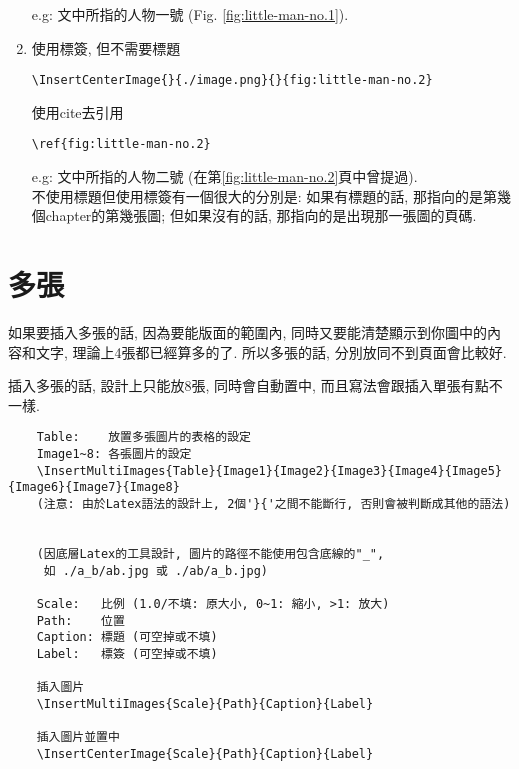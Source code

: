 \begin{enumerate}
{      e.g: 文中所指的人物一號 (Fig. \ref{fig:little-man-no.1}).
    } %

    \newpage

    \item
    {
      使用標簽, 但不需要標題\begin{verbatim}\InsertCenterImage{}{./image.png}{}{fig:little-man-no.2}\end{verbatim}
      使用cite去引用\begin{verbatim}\ref{fig:little-man-no.2}\end{verbatim}

      e.g: 文中所指的人物二號 (在第\ref{fig:little-man-no.2}頁中曾提過). \\

      不使用標題但使用標簽有一個很大的分別是: 如果有標題的話, 那指向的是第幾個chapter的第幾張圖; 但如果沒有的話, 那指向的是出現那一張圖的頁碼.
    } %
  \end{enumerate}

\newpage
\section{多張}

  如果要插入多張的話, 因為要能版面的範圍內, 同時又要能清楚顯示到你圖中的內容和文字, 理論上4張都已經算多的了. 所以多張的話, 分別放同不到頁面會比較好.

  插入多張的話, 設計上只能放8張, 同時會自動置中, 而且寫法會跟插入單張有點不一樣.

  \begin{framed}
  \begin{verbatim}
    Table:    放置多張圖片的表格的設定
    Image1~8: 各張圖片的設定
    \InsertMultiImages{Table}{Image1}{Image2}{Image3}{Image4}{Image5}{Image6}{Image7}{Image8}
    (注意: 由於Latex語法的設計上, 2個'}{'之間不能斷行, 否則會被判斷成其他的語法)


    (因底層Latex的工具設計, 圖片的路徑不能使用包含底線的"_",
     如 ./a_b/ab.jpg 或 ./ab/a_b.jpg)

    Scale:   比例 (1.0/不填: 原大小, 0~1: 縮小, >1: 放大)
    Path:    位置
    Caption: 標題 (可空掉或不填)
    Label:   標簽 (可空掉或不填)

    插入圖片
    \InsertMultiImages{Scale}{Path}{Caption}{Label}

    插入圖片並置中
    \InsertCenterImage{Scale}{Path}{Caption}{Label}
  \end{verbatim}
  \end{framed}

